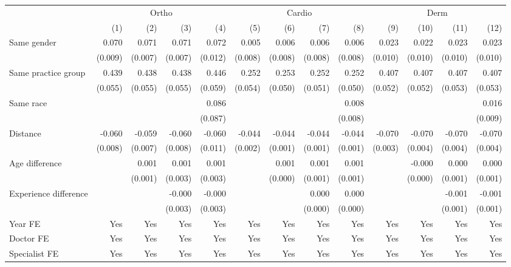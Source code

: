 \begin{tabular}{lrrrrrrrrrrrr}
\toprule
\multicolumn{1}{c}{ } & \multicolumn{4}{c}{Ortho} & \multicolumn{4}{c}{Cardio} & \multicolumn{4}{c}{Derm} \\
\cmidrule(l{3pt}r{3pt}){2-5} \cmidrule(l{3pt}r{3pt}){6-9} \cmidrule(l{3pt}r{3pt}){10-13}
 & (1) & (2) & (3) & (4) & (5) & (6) & (7) & (8) & (9) & (10) & (11) & (12)\\
\midrule
Same gender & 0.070 & 0.071 & 0.071 & 0.072 & 0.005 & 0.006 & 0.006 & 0.006 & 0.023 & 0.022 & 0.023 & 0.023\\
 & (0.009) & (0.007) & (0.007) & (0.012) & (0.008) & (0.008) & (0.008) & (0.008) & (0.010) & (0.010) & (0.010) & (0.010)\\
Same practice group & 0.439 & 0.438 & 0.438 & 0.446 & 0.252 & 0.253 & 0.252 & 0.252 & 0.407 & 0.407 & 0.407 & 0.407\\
 & (0.055) & (0.055) & (0.055) & (0.059) & (0.054) & (0.050) & (0.051) & (0.050) & (0.052) & (0.052) & (0.053) & (0.053)\\
Same race &   &   &   & 0.086 &   &   &   & 0.008 &   &   &   & 0.016\\
 &   &   &   & (0.087) &   &   &   & (0.008) &   &   &   & (0.009)\\
Distance & -0.060 & -0.059 & -0.060 & -0.060 & -0.044 & -0.044 & -0.044 & -0.044 & -0.070 & -0.070 & -0.070 & -0.070\\
 & (0.008) & (0.007) & (0.008) & (0.011) & (0.002) & (0.001) & (0.001) & (0.001) & (0.003) & (0.004) & (0.004) & (0.004)\\
Age difference &   & 0.001 & 0.001 & 0.001 &   & 0.001 & 0.001 & 0.001 &   & -0.000 & 0.000 & 0.000\\
 &   & (0.001) & (0.003) & (0.003) &   & (0.000) & (0.001) & (0.001) &   & (0.000) & (0.001) & (0.001)\\
Experience difference &   &   & -0.000 & -0.000 &   &   & 0.000 & 0.000 &   &   & -0.001 & -0.001\\
 &   &   & (0.003) & (0.003) &   &   & (0.000) & (0.000) &   &   & (0.001) & (0.001)\\
\midrule
Year FE & Yes & Yes & Yes & Yes & Yes & Yes & Yes & Yes & Yes & Yes & Yes & Yes\\
Doctor FE & Yes & Yes & Yes & Yes & Yes & Yes & Yes & Yes & Yes & Yes & Yes & Yes\\
Specialist FE & Yes & Yes & Yes & Yes & Yes & Yes & Yes & Yes & Yes & Yes & Yes & Yes\\
\bottomrule
\end{tabular}
